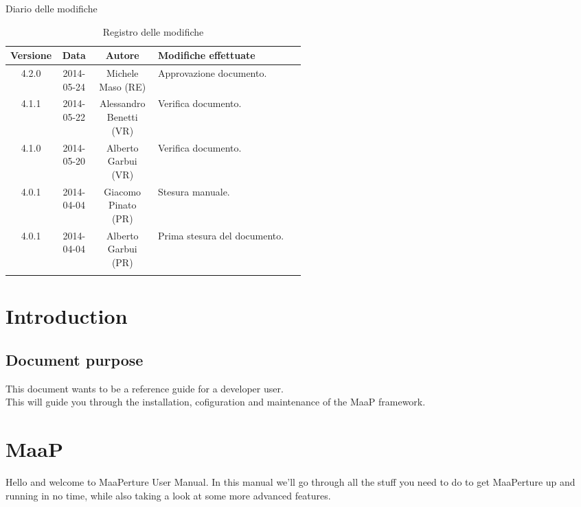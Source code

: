 
\newpage
Diario delle modifiche
\begin{center}
\begin{longtable}{|c|c|c|p{0.5\linewidth}|}
\toprule
\textbf{Versione} & \textbf{Data} & \textbf{Autore} & \textbf{Modifiche effettuate}\\

\midrule
4.2.0 & 2014-05-24 & Michele Maso (RE) & Approvazione documento.\\
\midrule
4.1.1 & 2014-05-22 & Alessandro Benetti (VR) & Verifica documento.\\
\midrule
4.1.0 & 2014-05-20 & Alberto Garbui (VR) & Verifica documento.\\

\midrule
4.0.1 & 2014-04-04 & Giacomo Pinato (PR) & Stesura manuale.\\
\midrule
4.0.1 & 2014-04-04 & Alberto Garbui (PR) & Prima stesura del documento.\\

\bottomrule
\caption{Registro delle modifiche}
\label{tab:changelog}

\end{longtable}
\end{center}

\newpage
\tableofcontents

\newpage

\newpage
\section{Introduction}
\subsection{Document purpose}
This document wants to be a reference guide for a developer user. \\
This will guide you through the installation, cofiguration and maintenance of the MaaP framework.

\newpage
\section{MaaP}
Hello and welcome to MaaPerture User Manual.
In this manual we'll go through all the stuff you need to do to get MaaPerture up and running in no time, while also taking a look at some more advanced features.

